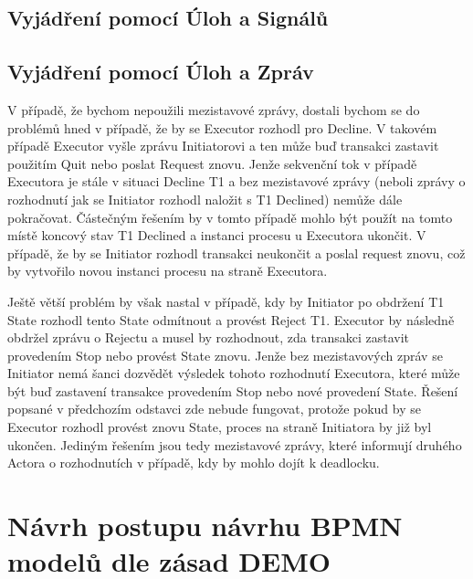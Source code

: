 \documentclass[]{article}
\begin{document}
\subsection{Vyjádření pomocí Úloh a Signálů}
\subsection{Vyjádření pomocí Úloh a Zpráv}
V případě, že bychom nepoužili mezistavové zprávy, dostali bychom se do problémů hned v případě, že by se Executor rozhodl pro Decline. V takovém případě Executor vyšle zprávu Initiatorovi a ten může buď transakci zastavit použitím Quit nebo poslat Request znovu. Jenže sekvenční tok v případě Executora je stále v situaci Decline T1 a bez mezistavové zprávy (neboli zprávy o rozhodnutí jak se Initiator rozhodl naložit s T1 Declined) nemůže dále pokračovat. Částečným řešením by v tomto případě mohlo být použít na tomto místě koncový stav T1 Declined a instanci procesu u Executora ukončit. V případě, že by se Initiator rozhodl transakci neukončit a poslal request znovu, což by vytvořilo novou instanci procesu na straně Executora.

Ještě větší problém by však nastal v případě, kdy by Initiator po obdržení T1 State rozhodl tento State odmítnout a provést Reject T1. Executor by následně obdržel zprávu o Rejectu a musel by rozhodnout, zda transakci zastavit provedením Stop nebo provést State znovu. Jenže bez mezistavových zpráv se Initiator nemá šanci dozvědět výsledek tohoto rozhodnutí Executora, které může být buď zastavení transakce provedením Stop nebo nové provedení State. Řešení popsané v předchozím odstavci zde nebude fungovat, protože pokud by se Executor rozhodl provést znovu State, proces na straně Initiatora by již byl ukončen. Jediným řešením jsou tedy mezistavové zprávy, které informují druhého Actora o rozhodnutích v případě, kdy by mohlo dojít k deadlocku.

\section{Návrh postupu návrhu BPMN modelů dle zásad DEMO}

\nocite{*}


\end{document}
